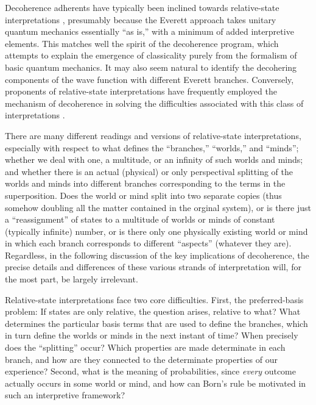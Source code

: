 \documentclass[rmp,aps,amsmath,amsfonts,noshowkeys,noshowpacs,12pt]{revtex4}
\begin{document}
Decoherence adherents have typically been inclined towards
relative-state interpretations \citep[for
instance][]{Zeh:1970:yt,Zeh:1973:wq,Zeh:1993:lt,Zurek:1998:re},
presumably because the Everett approach takes unitary quantum
mechanics essentially ``as is,'' with a minimum of added interpretive
elements. This matches well the spirit of the decoherence program,
which attempts to explain the emergence of classicality purely from
the formalism of basic quantum mechanics. It may also seem natural to
identify the decohering components of the wave function with different
Everett branches. Conversely, proponents of relative-state
interpretations have frequently employed the mechanism of decoherence
in solving the difficulties associated with this class of
interpretations \citep[see, for
example,][]{Saunders:1995:zx,Saunders:1997:za,Saunders:1998:rc,%
Deutsch:1985:rx,Deutsch:1996:fz,Deutsch:2001:aq,Vaidmain:1998:zp,%
Wallace:2003:iq,Wallace:2003:iz}.

There are many different readings and versions of relative-state
interpretations, especially with respect to what defines the
``branches,'' ``worlds,'' and ``minds''; whether we deal with one, a
multitude, or an infinity of such worlds and minds; and whether there
is an actual (physical) or only perspectival splitting of the worlds
and minds into different branches corresponding to the terms in the
superposition. Does the world or mind split into two separate copies
(thus somehow doubling all the matter contained in the orginal
system), or is there just a ``reassignment'' of states to a multitude
of worlds or minds of constant (typically infinite) number, or is
there only one physically existing world or mind in which each branch
corresponds to different ``aspects'' (whatever they are). Regardless,
in the following discussion of the key implications of decoherence,
the precise details and differences of these various strands of
interpretation will, for the most part, be largely irrelevant.

Relative-state interpretations face two core difficulties. First, the
preferred-basis problem: If states are only relative, the question
arises, relative to what? What determines the particular basis terms
that are used to define the branches, which in turn define the worlds
or minds in the next instant of time? When precisely does the
``splitting'' occur?  Which properties are made determinate in each
branch, and how are they connected to the determinate properties of
our experience? Second, what is the meaning of probabilities, since
\emph{every} outcome actually occurs in some world or mind, and how
can Born's rule be motivated in such an interpretive framework?
\end{document}
